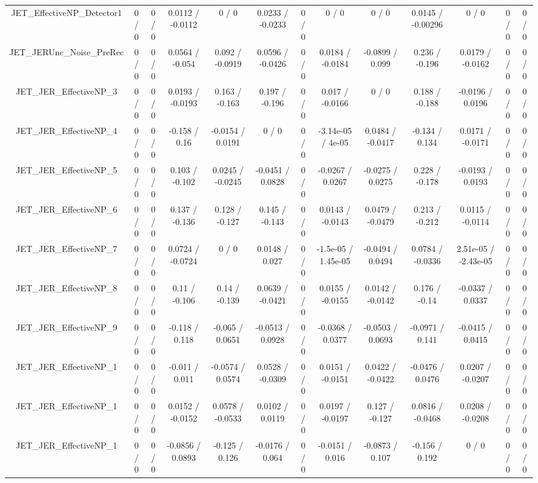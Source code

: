 \documentclass[10pt]{article}
\begin{document}
\begin{table}[htbp]
\begin{center}
\begin{tabular}{|c|c|c|c|c|c|c|c|c|c|c|c|c|}
  JET_EffectiveNP_Detector1 & 0 / 0 & 0 / 0 & 0.0112 / -0.0112 & 0 / 0 & 0.0233 / -0.0233 & 0 / 0 & 0 / 0 & 0 / 0 & 0.0145 / -0.00296 & 0 / 0 & 0 / 0 & 0 / 0 \\ 
  JET_JERUnc_Noise_PreRec & 0 / 0 & 0 / 0 & 0.0564 / -0.054 & 0.092 / -0.0919 & 0.0596 / -0.0426 & 0 / 0 & 0.0184 / -0.0184 & -0.0899 / 0.099 & 0.236 / -0.196 & 0.0179 / -0.0162 & 0 / 0 & 0 / 0 \\ 
  JET_JER_EffectiveNP_3 & 0 / 0 & 0 / 0 & 0.0193 / -0.0193 & 0.163 / -0.163 & 0.197 / -0.196 & 0 / 0 & 0.017 / -0.0166 & 0 / 0 & 0.188 / -0.188 & -0.0196 / 0.0196 & 0 / 0 & 0 / 0 \\ 
  JET_JER_EffectiveNP_4 & 0 / 0 & 0 / 0 & -0.158 / 0.16 & -0.0154 / 0.0191 & 0 / 0 & 0 / 0 & -3.14e-05 / 4e-05 & 0.0484 / -0.0417 & -0.134 / 0.134 & 0.0171 / -0.0171 & 0 / 0 & 0 / 0 \\ 
  JET_JER_EffectiveNP_5 & 0 / 0 & 0 / 0 & 0.103 / -0.102 & 0.0245 / -0.0245 & -0.0451 / 0.0828 & 0 / 0 & -0.0267 / 0.0267 & -0.0275 / 0.0275 & 0.228 / -0.178 & -0.0193 / 0.0193 & 0 / 0 & 0 / 0 \\ 
  JET_JER_EffectiveNP_6 & 0 / 0 & 0 / 0 & 0.137 / -0.136 & 0.128 / -0.127 & 0.145 / -0.143 & 0 / 0 & 0.0143 / -0.0143 & 0.0479 / -0.0479 & 0.213 / -0.212 & 0.0115 / -0.0114 & 0 / 0 & 0 / 0 \\ 
  JET_JER_EffectiveNP_7 & 0 / 0 & 0 / 0 & 0.0724 / -0.0724 & 0 / 0 & 0.0148 / 0.027 & 0 / 0 & -1.5e-05 / 1.45e-05 & -0.0494 / 0.0494 & 0.0784 / -0.0336 & 2.51e-05 / -2.43e-05 & 0 / 0 & 0 / 0 \\ 
  JET_JER_EffectiveNP_8 & 0 / 0 & 0 / 0 & 0.11 / -0.106 & 0.14 / -0.139 & 0.0639 / -0.0421 & 0 / 0 & 0.0155 / -0.0155 & 0.0142 / -0.0142 & 0.176 / -0.14 & -0.0337 / 0.0337 & 0 / 0 & 0 / 0 \\ 
  JET_JER_EffectiveNP_9 & 0 / 0 & 0 / 0 & -0.118 / 0.118 & -0.065 / 0.0651 & -0.0513 / 0.0928 & 0 / 0 & -0.0368 / 0.0377 & -0.0503 / 0.0693 & -0.0971 / 0.141 & -0.0415 / 0.0415 & 0 / 0 & 0 / 0 \\ 
  JET_JER_EffectiveNP_1 & 0 / 0 & 0 / 0 & -0.011 / 0.011 & -0.0574 / 0.0574 & 0.0528 / -0.0309 & 0 / 0 & 0.0151 / -0.0151 & 0.0422 / -0.0422 & -0.0476 / 0.0476 & 0.0207 / -0.0207 & 0 / 0 & 0 / 0 \\ 
  JET_JER_EffectiveNP_1 & 0 / 0 & 0 / 0 & 0.0152 / -0.0152 & 0.0578 / -0.0533 & 0.0102 / 0.0119 & 0 / 0 & 0.0197 / -0.0197 & 0.127 / -0.127 & 0.0816 / -0.0468 & 0.0208 / -0.0208 & 0 / 0 & 0 / 0 \\ 
  JET_JER_EffectiveNP_1 & 0 / 0 & 0 / 0 & -0.0856 / 0.0893 & -0.125 / 0.126 & -0.0176 / 0.064 & 0 / 0 & -0.0151 / 0.016 & -0.0873 / 0.107 & -0.156 / 0.192 & 0 / 0 & 0 / 0 & 0 / 0 \\ 

\end{tabular}
\end{center}
\end{table}
\end{document}
